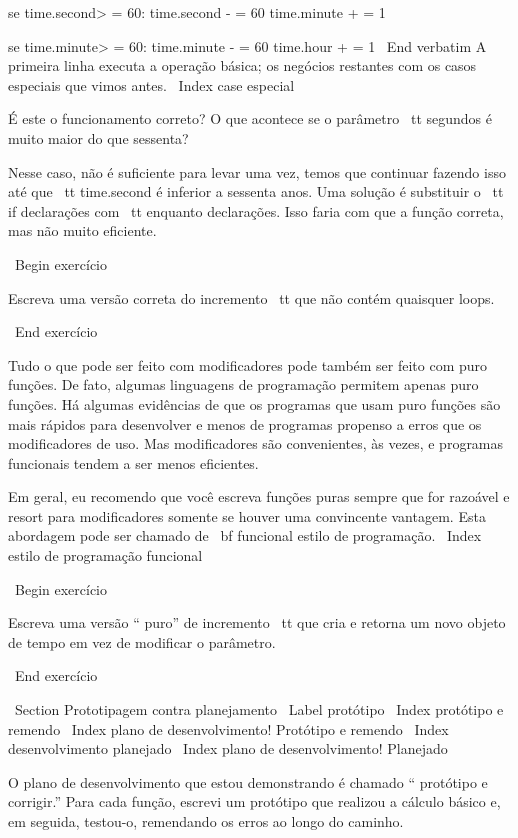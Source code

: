 \documentclass[10pt]{book}
\begin{document}
{{{{{{{{{{{{{{    se time.second> = 60:
        time.second - = 60
        time.minute + = 1

    se time.minute> = 60:
        time.minute - = 60
        time.hour + = 1
\ End {verbatim}
%
A primeira linha executa a operação básica; os negócios restantes
com os casos especiais que vimos antes.
\ Index {case especial}

É este o funcionamento correto? O que acontece se o parâmetro {\ tt segundos}
é muito maior do que sessenta?  

Nesse caso, não é suficiente para levar
uma vez, temos que continuar fazendo isso até que {\ tt time.second} é inferior a sessenta anos.
Uma solução é substituir o {\ tt if} declarações com {\ tt enquanto}
declarações. Isso faria com que a função correta, mas não
muito eficiente.

\ Begin {} exercício

Escreva uma versão correta do incremento {\ tt} que
não contém quaisquer loops.

\ End {} exercício

Tudo o que pode ser feito com modificadores pode também ser feito com puro
funções. De fato, algumas linguagens de programação permitem apenas puro
funções. Há algumas evidências de que os programas que usam puro
funções são mais rápidos para desenvolver e menos de programas propenso a erros
que os modificadores de uso. Mas modificadores são convenientes, às vezes,
e programas funcionais tendem a ser menos eficientes.

Em geral, eu recomendo que você escreva funções puras sempre que for
razoável e resort para modificadores somente se houver uma convincente
vantagem. Esta abordagem pode ser chamado de {\ bf funcional
estilo de programação}.
\ Index {estilo de programação funcional}


\ Begin {} exercício

Escreva uma versão `` puro'' de {incremento \ tt} que cria e retorna
um novo objeto de tempo em vez de modificar o parâmetro.

\ End {} exercício


\ Section {Prototipagem contra planejamento}
\ Label {protótipo}
\ Index {protótipo e remendo}
\ Index {plano de desenvolvimento! Protótipo e remendo}
\ Index {desenvolvimento planejado}
\ Index {plano de desenvolvimento! Planejado}

O plano de desenvolvimento que estou demonstrando é chamado `` protótipo e
corrigir.'' Para cada função, escrevi um protótipo que realizou a
cálculo básico e, em seguida, testou-o, remendando os erros ao longo do
caminho.

}}}}}}}}}}}}}}
\end{document}
